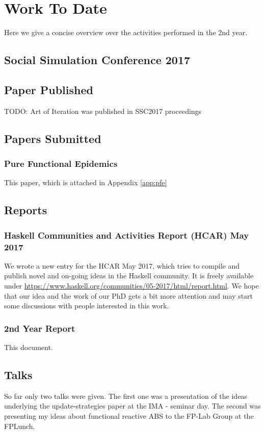 \chapter{Work To Date}
\label{chap:work}

Here we give a concise overview over the activities performed in the 2nd year.

\section{Social Simulation Conference 2017}


\section{Paper Published}
TODO: Art of Iteration was published in SSC2017 proceedings

\section{Papers Submitted}
\subsection{Pure Functional Epidemics}
This paper, which is attached in Appendix \ref{app:pfe}

\section{Reports}
\subsection{Haskell Communities and Activities Report (HCAR) May 2017}
We wrote a new entry for the HCAR May 2017, which tries to compile and publish novel and on-going ideas in the Haskell community. It is freely available under \url{https://www.haskell.org/communities/05-2017/html/report.html}. We hope that our idea and the work of our PhD gets a bit more attention and may start some discussions with people interested in this work.

\subsection{2nd Year Report}
This document.


\section{Talks}
So far only two talks were given. The first one was a presentation of the ideas underlying the update-strategies paper at the IMA - seminar day. The second was presenting my ideas about functional reactive ABS to the FP-Lab Group at the FPLunch.